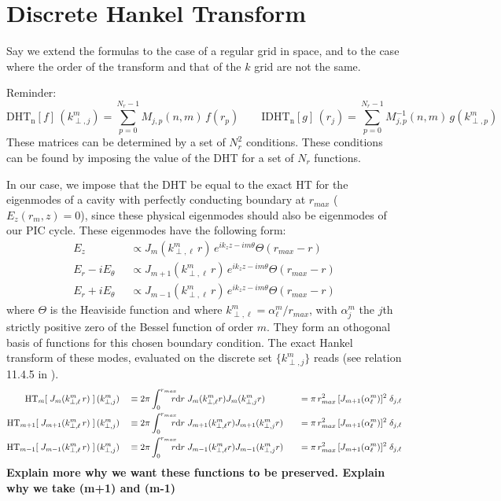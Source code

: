 \section{Discrete Hankel Transform}
\label{sec:HTMatrix}

Say we extend the formulas \cite{Guizar} to the case of a regular
grid in space, and to the case where the order of the transform and
that of the $k$ grid are not the same.

Reminder:
\[ \mathrm{DHT_n}[f] \,(k^m_{\perp,j}) = \sum_{p=0}^{N_r-1} M_{j,p}(n,m)
\,f(r_p) \qquad \mathrm{IDHT_n}[g] \, (r_j) = \sum_{p=0}^{N_r-1}
M^{-1}_{j,p}(n,m) \,g(k^m_{\perp,p}) \]
These matrices can be determined by a set of $N_r^2$ conditions. These
conditions can be found by imposing the value of the DHT for a set of  $N_r$ functions.

In our case, we impose that the DHT be equal to the exact HT for the eigenmodes of a cavity with
perfectly conducting boundary at $r_{max}$ ($E_z(r_{m},z) =
0$), since these physical eigenmodes should also be eigenmodes of our
PIC cycle. These eigenmodes have the following form:
\begin{align*}
E_z \;& \; \propto  J_m(k^m_{\perp,\ell} \,r)\,e^{ik_z z -im\theta} \Theta(r_{max}-r) \\
E_r -i E_\theta \;& \; \propto  J_{m+1}(k^m_{\perp,\ell} \,r) \,e^{ik_z z -im\theta} \Theta(r_{max}-r)\\
E_r +i E_\theta \;& \; \propto  J_{m-1}(k^m_{\perp,\ell} \,r) \,e^{ik_z z -im\theta} \Theta(r_{max}-r) 
\end{align*}
where $\Theta$ is the Heaviside function and where $k^m_{\perp,\ell} =
\alpha^m_\ell / r_{max}$, with $\alpha^m_j$ the $j$th strictly positive zero of
the Bessel function of order $m$. They form an othogonal basis of
functions for this chosen boundary condition. The exact Hankel transform of these modes, evaluated on the discrete set $\{
k^m_{\perp,j} \}$ reads (see relation 11.4.5 in \cite{Abramowitz}).
\begin{align*} 
\mathrm{HT}_{m}[ \; J_m(k^m_{\perp,\ell} \,r) \;] \,(k^m_{\perp,j} )
&\quad \equiv 2\pi \rInteg \; J_m (k^m_{\perp,\ell} r) J_m (k^m_{\perp,j} r)
&\quad = \pi\, r_{max}^2\,[ J_{m+1}(\alpha_\ell^m)]^2 \; \delta_{j,\ell} \\
\mathrm{HT}_{m+1}[ \; J_{m+1}(k^m_{\perp,\ell} \,r) \;] \,(k^m_{\perp,j} )
&\quad \equiv 2\pi \rInteg \; J_{m+1} (k^m_{\perp,\ell} r)
  J_{m+1}(k^m_{\perp,j} r) 
&\quad = \pi\, r_{max}^2\,[ J_{m+1}(\alpha_\ell^m)]^2 \; \delta_{j,\ell} \\
\mathrm{HT}_{m-1}[ \; J_{m-1}(k^m_{\perp,\ell} \,r) \;] \,(k^m_{\perp,j} )
& \quad \equiv 2\pi \rInteg \; J_{m-1} (k^m_{\perp,\ell} r) J_{m-1} (k^m_{\perp,j}
  r) 
&\quad = \pi\, r_{max}^2\,[ J_{m+1}(\alpha_\ell^m)]^2 \; \delta_{j,\ell}
\end{align*}
\textbf{Explain more why we want these functions to be
  preserved. Explain why we take (m+1) and (m-1)}

